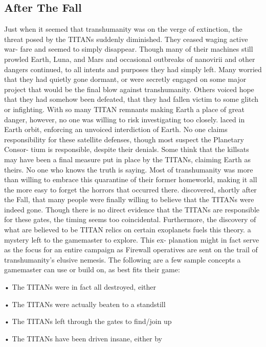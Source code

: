\subsection{After The Fall}

Just when it seemed that transhumanity was on the 
verge of extinction, the threat posed by the TITANs 
suddenly diminished. They ceased waging active war-
fare and seemed to simply disappear. Though many of 
their machines still prowled Earth, Luna, and Mars and 
occasional outbreaks of nanovirii and other dangers 
continued, to all intents and purposes they had simply 
left. Many worried that they had quietly gone dormant, 
or were secretly engaged on some major project that 
would be the final blow against transhumanity. Others 
voiced hope that they had somehow been defeated, 
that they had fallen victim to some glitch or infighting. 
With so many TITAN remnants making Earth a place 
of great danger, however, no one was willing to risk 
investigating too closely.
laced in Earth orbit, enforcing an unvoiced interdiction 
of Earth. No one claims responsibility for these satellite 
defenses, though most suspect the Planetary Consor-
tium is responsible, despite their denials. Some think 
that the killsats may have been a final measure put in 
place by the TITANs, claiming Earth as theirs. No one 
who knows the truth is saying. Most of transhumanity 
was more than willing to embrace this quarantine of 
their former homeworld, making it all the more easy to 
forget the horrors that occurred there. 
discovered, shortly after the Fall, that many people 
were finally willing to believe that the TITANs were 
indeed gone. Though there is no direct evidence that 
the TITANs are responsible for these gates, the timing 
seems too coincidental. Furthermore, the discovery 
of what are believed to be TITAN relics on certain 
exoplanets fuels this theory.
a mystery left to the gamemaster to explore. This ex-
planation might in fact serve as the focus for an entire 
campaign as Firewall operatives are sent on the trail 
of transhumanity's elusive nemesis. The following are 
a few sample concepts a gamemaster can use or build 
on, as best fits their game:

•  The TITANs were in fact all destroyed, either 

•  The TITANs were actually beaten to a standstill 

•  The TITANs left through the gates to find/join up 

•  The TITANs have been driven insane, either by 

